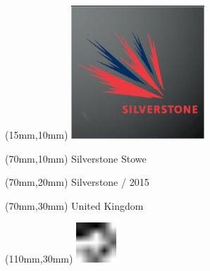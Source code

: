 \null\newpage
\begin{textblock*}{50mm}(15mm,10mm)%
\includegraphics[width=50mm]{LG/2015-05-20_00094.png}
\end{textblock*}
\begin{textblock*}{130mm}(70mm,10mm)%
{\fontsize{20}{20}\selectfont Silverstone Stowe}\\
\end{textblock*}
\begin{textblock*}{120mm}(70mm,20mm)%
{\fontsize{16}{16}\selectfont Silverstone / 2015}\\
\end{textblock*}
\begin{textblock*}{120mm}(70mm,30mm)%
{\fontsize{12}{12}\selectfont United Kingdom}
\end{textblock*}
\begin{textblock*}{30mm}(110mm,30mm)%
\centering
\includegraphics[height=15mm]{icons/fa-rotate-left.pdf}
\end{textblock*}
